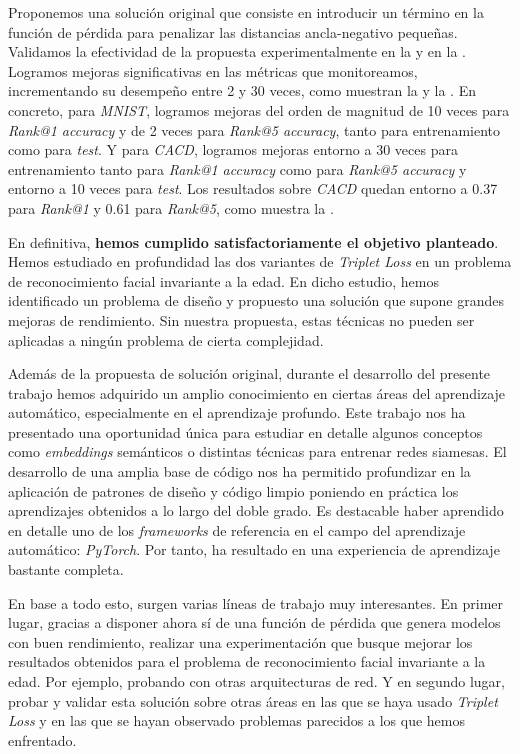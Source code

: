 Proponemos una solución original que consiste en introducir un término en la función de pérdida para penalizar las distancias ancla-negativo pequeñas. Validamos la efectividad de la propuesta experimentalmente en la  y en la . Logramos mejoras significativas en las métricas que monitoreamos, incrementando su desempeño entre 2 y 30 veces, como muestran la  y la . En concreto, para \textit{MNIST}, logramos mejoras del orden de magnitud de 10 veces para \textit{Rank@1 accuracy} y de 2 veces para \textit{Rank@5 accuracy}, tanto para entrenamiento como para \textit{test}. Y para \textit{CACD}, logramos mejoras entorno a 30 veces para entrenamiento tanto para \textit{Rank@1 accuracy} como para \textit{Rank@5 accuracy} y entorno a 10 veces para \textit{test}. Los resultados sobre \textit{CACD} quedan entorno a 0.37 para \textit{Rank@1} y 0.61 para \textit{Rank@5}, como muestra la .

En definitiva, \textbf{hemos cumplido satisfactoriamente el objetivo planteado}. Hemos estudiado en profundidad las dos variantes de \textit{Triplet Loss} en un problema de reconocimiento facial invariante a la edad. En dicho estudio, hemos identificado un problema de diseño y propuesto una solución que supone grandes mejoras de rendimiento. Sin nuestra propuesta, estas técnicas no pueden ser aplicadas a ningún problema de cierta complejidad.

Además de la propuesta de solución original, durante el desarrollo del presente trabajo hemos adquirido un amplio conocimiento en ciertas áreas del aprendizaje automático, especialmente en el aprendizaje profundo. Este trabajo nos ha presentado una oportunidad única para estudiar en detalle algunos conceptos como \textit{embeddings} semánticos o distintas técnicas para entrenar redes siamesas. El desarrollo de una amplia base de código nos ha permitido profundizar en la aplicación de patrones de diseño y código limpio poniendo en práctica los aprendizajes obtenidos a lo largo del doble grado. Es destacable haber aprendido en detalle uno de los \textit{frameworks} de referencia en el campo del aprendizaje automático: \textit{PyTorch}. Por tanto, ha resultado en una experiencia de aprendizaje bastante completa.

En base a todo esto, surgen varias líneas de trabajo muy interesantes. En primer lugar, gracias a disponer ahora sí de una función de pérdida que genera modelos con buen rendimiento, realizar una experimentación que busque mejorar los resultados obtenidos para el problema de reconocimiento facial invariante a la edad. Por ejemplo, probando con otras arquitecturas de red. Y en segundo lugar, probar y validar esta solución sobre otras áreas en las que se haya usado \textit{Triplet Loss} y en las que se hayan observado problemas parecidos a los que hemos enfrentado.
